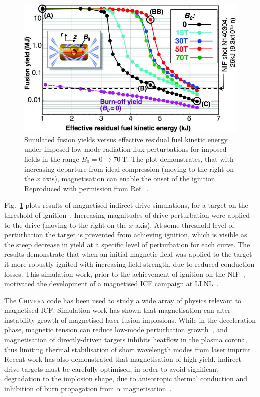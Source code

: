 \begin{figure}[t!]
    \includegraphics[width=0.75\linewidth]{Results2/Images/magicf_perkins.jpeg}
    \centering
    \caption{Simulated fusion yields versus effective residual fuel kinetic energy under imposed low-mode radiation flux perturbations for imposed fields in the range $B_0=0\rightarrow70\ \text{T}$.
    The plot demonstrates, that with increasing departure from ideal compression (moving to the right on the $x$ axis), magnetisation can enable the onset of the ignition.
    Reproduced with permission from Ref.~\cite{perkins_potential_2017}.}%
    \label{fig:Res2_perkins_magicf}
\end{figure}

Fig.~\ref{fig:Res2_perkins_magicf} plots results of magnetised indirect-drive simulations, for a target on the threshold of ignition~\cite{perkins_potential_2017}.
Increasing magnitudes of drive perturbation were applied to the drive (moving to the right on the $x$-axis).
At some threshold level of perturbation the target is prevented from achieving ignition, which is visible as the steep decrease in yield at a specific level of perturbation for each curve.
The results demonstrate that when an initial magnetic field was applied to the target it more robustly ignited with increasing field strength, due to reduced conduction losses.
This simulation work, prior to the achievement of ignition on the \ac{NIF}~\cite{zylstra_burning_2022}, motivated the development of a magnetised \ac{ICF} campaign at \ac{LLNL}~\cite{moody_magnetized_2022}.

The \textsc{Chimera} code has been used to study a wide array of physics relevant to magnetised \ac{ICF}.
Simulation work has shown that magnetisation can alter instability growth of magnetised laser fusion implosions.
While in the deceleration phase, magnetic tension can reduce low-mode perturbation growth~\cite{walsh_perturbation_2019}, and magnetisation of directly-driven targets inhibits heatflow in the plasma corona, thus limiting thermal stabilisation of short wavelength modes from laser imprint~\cite{walsh_magnetized_2020}.
Recent work has also demonstrated that magnetisation of high-yield, indirect-drive targets must be carefully optimised, in order to avoid significant degradation to the implosion shape, due to anisotropic thermal conduction and inhibition of burn propagation from $\alpha$ magnetisation~\cite{oneill_modelling_2023}.

